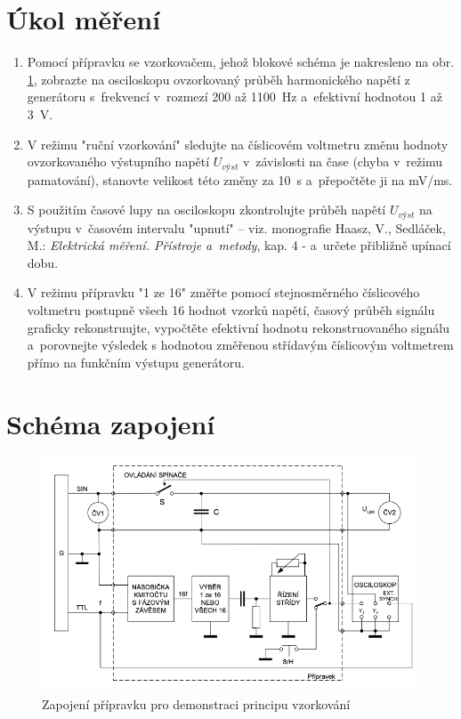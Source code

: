 \documentclass[a4paper,12pt]{article}   %
\begin{document}
\section{Úkol měření}
\label{chap:ukol}
\begin{enumerate}
    \item Pomocí přípravku se vzorkovačem, jehož blokové schéma je nakresleno na obr. \ref{fig:zapojeni}, zobrazte na osciloskopu ovzorkovaný průběh harmonického napětí z generátoru s~frekvencí v~rozmezí 200 až 1100~Hz a~efektivní hodnotou 1 až 3~V.
    \item V režimu "ruční vzorkování" sledujte na číslicovém voltmetru změnu hodnoty ovzorkovaného výstupního napětí $U_{výst}$ v~závislosti na čase (chyba v~režimu pamatování), stanovte velikost této změny za 10~s a~přepočtěte ji na mV/ms.
    \item S použitím časové lupy na osciloskopu zkontrolujte průběh napětí $U_{výst}$ na výstupu v~časovém intervalu "upnutí" – viz. monografie Haasz, V., Sedláček, M.: \textit{Elektrická měření. Přístroje a~metody}, kap. 4 - a~určete přibližně upínací dobu.
    \item V režimu přípravku "1 ze 16" změřte pomocí stejnosměrného číslicového voltmetru postupně všech 16 hodnot vzorků napětí, časový průběh signálu graficky rekonstruujte, vypočtěte efektivní hodnotu rekonstruovaného signálu a~porovnejte výsledek s hodnotou změřenou střídavým číslicovým voltmetrem přímo na funkčním výstupu generátoru.
    
\end{enumerate}

\section{Schéma zapojení}
\label{chap:schema_zapojeni}
\begin{figure}[h!]
  \centering
  \includegraphics[width=.6\textwidth]{schema_zapojeni.png}
  \caption{Zapojení přípravku pro demonstraci principu vzorkování}
  \label{fig:zapojeni}
\end{figure}
\end{document}
